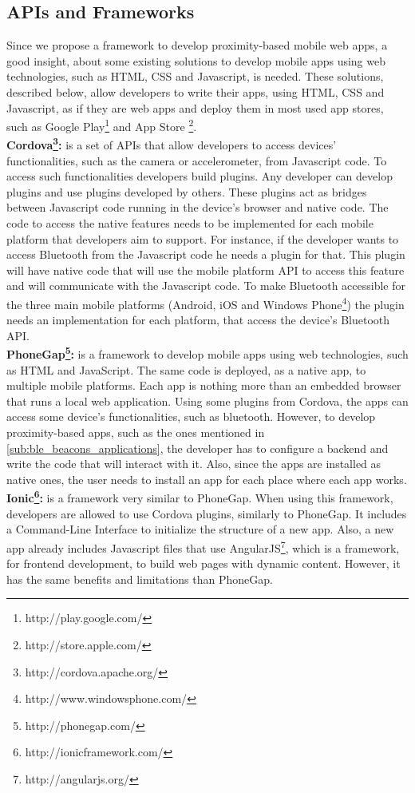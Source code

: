 \subsection{APIs and Frameworks}
\label{sub:frameworks_web}
Since we propose a framework to develop proximity-based
mobile web apps, a good insight, about some existing
solutions to develop mobile apps using web technologies,
such as 
HTML, CSS and Javascript, 
is needed.
These solutions, described below, allow developers to
write their apps, using HTML, CSS and Javascript, as
if they are web apps and deploy them in most used app
stores, such as 
Google Play\footnote{http://play.google.com/}
and
App Store \footnote{http://store.apple.com/}.
\\
\textbf{Cordova\footnote{http://cordova.apache.org/}:}
is a set of APIs that allow developers to access
devices' functionalities, such as the camera or
accelerometer, from Javascript code.
To access such functionalities developers build plugins.
Any developer can develop plugins and use plugins
developed by others. These plugins act as bridges
between Javascript code running in the device's
browser and native code.
The code to access the native features
needs to be implemented for each mobile platform
that developers aim to support.
For instance, if
the developer wants to access Bluetooth from
the Javascript code he needs a plugin for that.
This plugin will have native code that will
use the mobile platform API to access this
feature and will communicate with the Javascript
code. To make Bluetooth accessible
for the three main mobile platforms
(Android, iOS and 
Windows Phone\footnote{http://www.windowsphone.com/})
the plugin
needs an implementation for each platform, that
access the device's Bluetooth API.
\\
\textbf{PhoneGap\footnote{http://phonegap.com/}:}
is a framework to develop mobile apps
using web technologies, such as HTML and JavaScript. The
same code is deployed, as a native app, to multiple mobile
platforms. Each app is nothing more than an embedded browser
that runs a local web application. 
Using some plugins from Cordova, the apps can access some
device's functionalities, such as bluetooth. 
However, to develop proximity-based apps, such as
the ones mentioned in 
\ref{sub:ble_beacons_applications},
the developer has to configure a backend and write the
code that will interact with it. Also, since the apps are
installed as native ones, the user needs to install
an app for each place where each app works.
\\
\textbf{Ionic\footnote{http://ionicframework.com/}:}
is a framework very similar to PhoneGap. When using
this framework, developers are allowed to use Cordova
plugins, similarly to PhoneGap. It includes a
Command-Line Interface to initialize the structure
of a new app. Also, a new app already includes Javascript
files that use 
AngularJS\footnote{http://angularjs.org/}, 
which is a framework, for frontend development,
to build web pages with dynamic content.
However, it has the same benefits and limitations
than PhoneGap.

